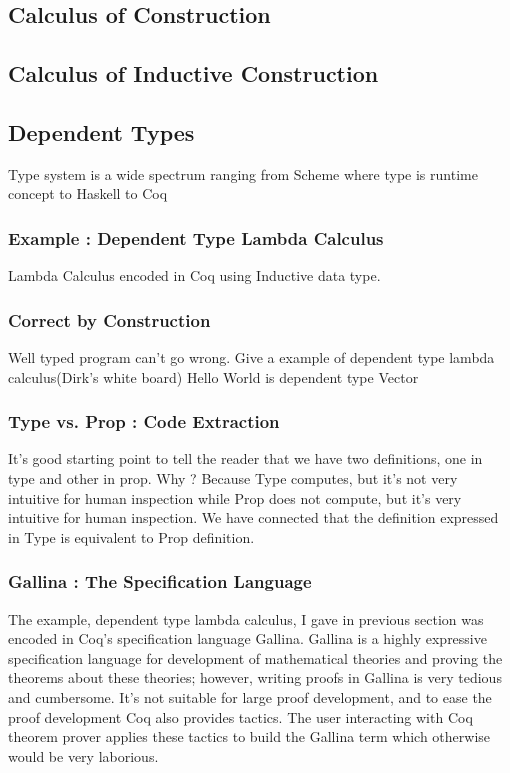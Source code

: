 \subsection{Calculus of Construction}
\subsection{Calculus of Inductive Construction}
 
 

 
\subsection{Dependent Types}
    Type system is a wide spectrum ranging from Scheme where 
    type is runtime concept to Haskell to Coq 
    
    \subsubsection{Example : Dependent Type Lambda Calculus}
     Lambda Calculus encoded in Coq using Inductive data type. 
     
 \subsubsection{Correct by Construction}
  Well typed program can't go wrong. 
  Give a example of dependent type lambda calculus(Dirk's white board)
  Hello World is dependent type Vector 
 \subsubsection{Type vs. Prop : Code Extraction}
  It's good starting point to tell the reader that we have two definitions, 
  one in type and other in prop. Why ? Because Type computes, but it's
  not very intuitive for human inspection while Prop does not compute, 
  but it's very intuitive for human inspection. We have connected that 
  the definition expressed in Type is equivalent to Prop definition. 
 
 \subsubsection{Gallina : The Specification Language}
  The example, dependent type lambda calculus, I gave in previous 
  section was encoded in Coq's specification language Gallina. 
  Gallina is a highly expressive specification 
  language for development of mathematical theories and proving the    
  theorems about these  theories; however, writing proofs in Gallina
  is very tedious and cumbersome. It's not suitable for large proof 
  development, and to ease the proof development Coq also provides 
  tactics.  The user interacting with Coq theorem prover applies these 
  tactics to build the  Gallina term  which otherwise would  
  be very laborious.
  
